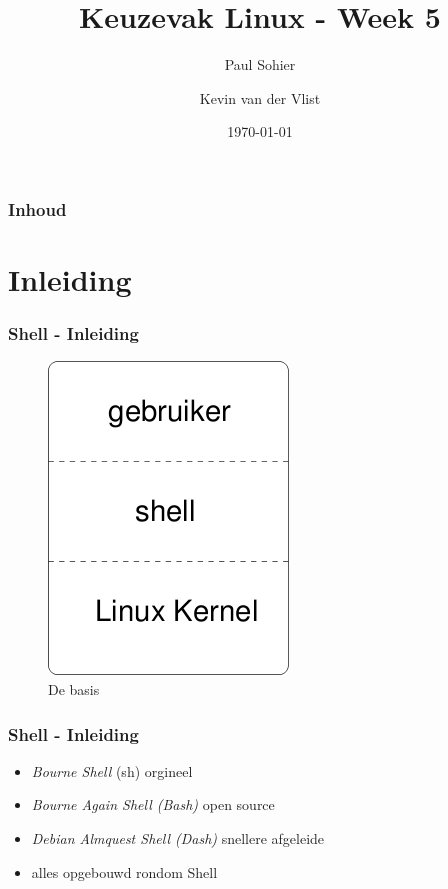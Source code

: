 \documentclass{beamer}
\title{Keuzevak Linux - Week 5}
\author{Paul Sohier \and Kevin van der Vlist}
\institute{Versie $1.0$}
\date{\today}
\begin{document}
\begin{frame}
  \titlepage
\end{frame} 

\begin{frame}
  \frametitle{Inhoud}
  \tableofcontents
\end{frame}


\section{Inleiding}

\begin{frame}
\frametitle{Shell - Inleiding}
\begin{figure}[H]
  \begin{center}
    \includegraphics[scale=0.5]{images/shell_intro}
  \end{center}
  \caption{De basis}
  \label{fig:shell}
\end{figure}
\end{frame}

\begin{frame}
  \frametitle{Shell - Inleiding}
  \begin{itemize}
    \item<1-> \emph{Bourne Shell} (sh) orgineel
    \item<2-> \emph{Bourne Again Shell (Bash)} open source
    \item<3-> \emph{Debian Almquest Shell (Dash)} snellere afgeleide
    \item<4-> alles opgebouwd rondom Shell
  \end{itemize}
\end{frame}
\end{document}
